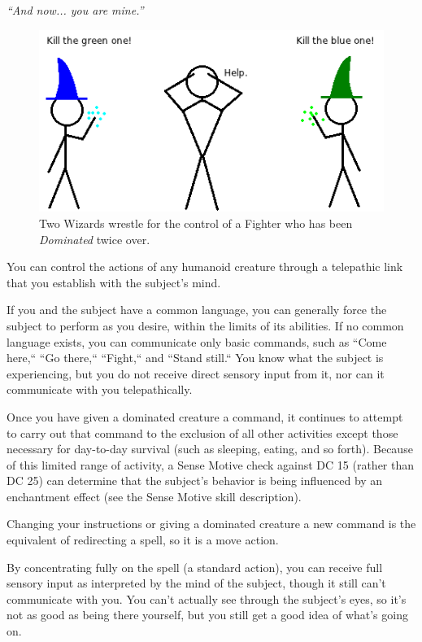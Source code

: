 \emph{``And now... you are mine.''}

\begin{figure}
  \caption{Two Wizards wrestle for the control of a Fighter who has been \emph{Dominated} twice over.}
  \centering
    \includegraphics{Pics/Dominate.png}
\end{figure}

You can control the actions of any humanoid creature through a telepathic link that you establish with the subject's mind.

If you and the subject have a common language, you can generally force the subject to perform as you desire, within the limits of its abilities. 
If no common language exists, you can communicate only basic commands, such as ``Come here,`` ``Go there,`` ``Fight,`` and ``Stand still.`` 
You know what the subject is experiencing, but you do not receive direct sensory input from it, nor can it communicate with you telepathically.

Once you have given a dominated creature a command, 
it continues to attempt to carry out that command to the exclusion of all other activities except those necessary for day-to-day survival 
(such as sleeping, eating, and so forth). 
Because of this limited range of activity, a Sense Motive check against DC 15 (rather than DC 25) 
can determine that the subject's behavior is being influenced by an enchantment effect (see the Sense Motive skill description).

Changing your instructions or giving a dominated creature a new command is the equivalent of redirecting a spell, so it is a move action.

By concentrating fully on the spell (a standard action), 
you can receive full sensory input as interpreted by the mind of the subject, though it still can't communicate with you. 
You can't actually see through the subject's eyes, so it's not as good as being there yourself, but you still get a good idea of what's going on.

